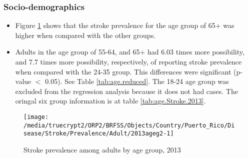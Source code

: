\newpage
\subsubsection{Socio-demographics}

\begin{itemize}

\item Figure \ref{fig:age.Stroke.2013} shows that the stroke prevalence for the age group of
65+
was higher when compared with the other groups.

\item Adults in the age group of 55-64, and 65+ had 6.03 times more possibility, and 7.7 times more possibility, respectively, of reporting stroke prevalence when compared with the 24-35 group. This differences were significant (p-value $<$ 0.05). See Table \ref{tab:age.reduced}. The 18-24 age group was excluded from the regression analysis because it does not had cases. The oringal six group information is at table \ref{tab:age.Stroke.2013}.


\end{itemize}


\begin{figure}[H]
\caption{Stroke prevalence among adults by age group, 
2013}
\begin{knitrout}
\color{fgcolor}

{\centering \texttt{[image: /media/truecrypt2/ORP2/BRFSS/Objects/Country/Puerto\_Rico/Disease/Stroke/Prevalence/Adult/2013ageg2-1]} 

}



\end{knitrout}
\label{fig:age.Stroke.2013}
\end{figure}



